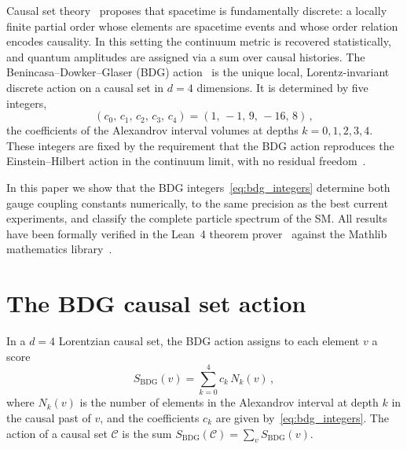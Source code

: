 \documentclass[11pt,twocolumn]{article}
\newcommand{\bdg}{\mathrm{BDG}}
\begin{document}
Causal set theory~\cite{Bombelli1987,Henson2009} proposes that
spacetime is fundamentally discrete: a locally finite partial order
whose elements are spacetime events and whose order relation encodes
causality. In this setting the continuum metric is recovered
statistically, and quantum amplitudes are assigned via a sum over
causal histories. The Benincasa--Dowker--Glaser (BDG) action~\cite{Benincasa2010,Glaser2014}
is the unique local, Lorentz-invariant discrete action on a causal
set in $d=4$ dimensions. It is determined by five integers,
\begin{equation}
  (c_0,\,c_1,\,c_2,\,c_3,\,c_4) = (1,\,-1,\,9,\,-16,\,8)\,,
  \label{eq:bdg_integers}
\end{equation}
the coefficients of the Alexandrov interval volumes at depths
$k=0,1,2,3,4$. These integers are fixed by the requirement that
the BDG action reproduces the Einstein--Hilbert action in the
continuum limit, with no residual freedom~\cite{Glaser2014}.

In this paper we show that the BDG integers~\eqref{eq:bdg_integers}
determine both gauge coupling constants numerically, to the same
precision as the best current experiments, and classify the
complete particle spectrum of the SM.
All results have been formally verified in the Lean~4 theorem
prover~\cite{Moura2021} against the Mathlib mathematics
library~\cite{Mathlib2024}.

\section{The BDG causal set action}

In a $d=4$ Lorentzian causal set, the BDG action assigns to each
element $v$ a score
\begin{equation}
  S_\bdg(v) = \sum_{k=0}^{4} c_k\, N_k(v)\,,
  \label{eq:bdg_score}
\end{equation}
where $N_k(v)$ is the number of elements in the Alexandrov interval
at depth $k$ in the causal past of $v$, and the coefficients $c_k$
are given by~\eqref{eq:bdg_integers}.
The action of a causal set $\mathcal{C}$ is the sum $S_\bdg(\mathcal{C})
= \sum_v S_\bdg(v)$.
\end{document}

